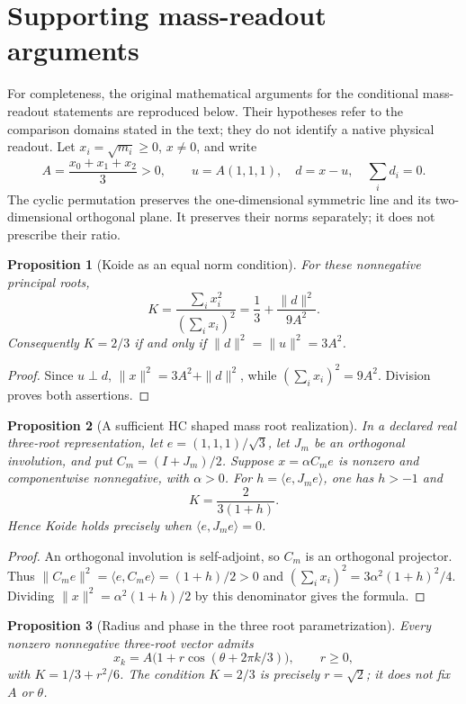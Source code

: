 \documentclass[11pt,a4paper]{article}
\newtheorem{proposition}{Proposition}[section]
\begin{document}
\section{Supporting mass-readout arguments}
For completeness, the original mathematical arguments for the conditional mass-readout statements are reproduced below. Their hypotheses refer to the comparison domains stated in the text; they do not identify a native physical readout.
Let $x_i=\sqrt{m_i}\geq0$, $x\ne0$, and write
\[
 A=\frac{x_0+x_1+x_2}{3}>0,\qquad
 u=A(1,1,1),\quad d=x-u,\quad \sum_i d_i=0.
\]
The cyclic permutation preserves the one-dimensional symmetric line
and its two-dimensional orthogonal plane. It preserves their norms
separately; it does not prescribe their ratio.
\begin{proposition}[Koide as an equal norm condition]
\label{v480:koide-equal-norm}
For these nonnegative principal roots,
\[
 K=\frac{\sum_i x_i^2}{(\sum_i x_i)^2}
   =\frac13+\frac{\|d\|^2}{9A^2}.
\]
Consequently $K=2/3$ if and only if
$\|d\|^2=\|u\|^2=3A^2$.
\end{proposition}
\begin{proof}
Since $u\perp d$, $\|x\|^2=3A^2+\|d\|^2$, while
$(\sum_i x_i)^2=9A^2$. Division proves both assertions.
\end{proof}
\begin{proposition}[A sufficient HC shaped mass root realization]
\label{v480:koide-hc-mixing}
In a declared real three-root representation, let
$e=(1,1,1)/\sqrt3$, let $J_m$ be an orthogonal involution, and put
$C_m=(I+J_m)/2$. Suppose $x=\alpha C_m e$ is nonzero and
componentwise nonnegative, with $\alpha>0$. For
$h=\langle e,J_m e\rangle$, one has $h>-1$ and
\[
 K=\frac{2}{3(1+h)}.
\]
Hence Koide holds precisely when $\langle e,J_m e\rangle=0$.
\end{proposition}
\begin{proof}
An orthogonal involution is self-adjoint, so $C_m$ is an
orthogonal projector. Thus
$\|C_m e\|^2=\langle e,C_m e\rangle=(1+h)/2>0$ and
$(\sum_i x_i)^2=3\alpha^2(1+h)^2/4$. Dividing
$\|x\|^2=\alpha^2(1+h)/2$ by this denominator gives the formula.
\end{proof}
\begin{proposition}[Radius and phase in the three root parametrization]
\label{v480:koide-radius-phase}
Every nonzero nonnegative three-root vector admits
\[
 x_k=A\bigl(1+r\cos(\theta+2\pi k/3)\bigr),\qquad r\geq0,
\]
with $K=1/3+r^2/6$. The condition $K=2/3$ is precisely $r=\sqrt2$;
it does not fix $A$ or $\theta$.
\end{proposition}
\end{document}
